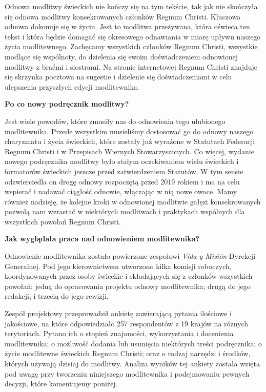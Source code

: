 ﻿\documentclass[9pt,twoside]{extarticle}
\newcommand{\ltrhdr}[1]{{\par\noindent\bf #1\par}}
\begin{document}
Odnowa modlitwy świeckich nie kończy się na tym tekście, tak jak nie skończyła się odnowa modlitwy konsekrowanych członków Regnum Christi. Kluczowa odnowa dokonuje się w życiu. Jest to modlitwa przeżywana, która oświeca ten tekst i która będzie domagać się okresowego odnawiania w miarę upływu naszego życia modlitewnego. Zachęcamy wszystkich członków Regnum Christi, wszystkie modlące się wspólnoty, do dzielenia się swoim doświadczeniem odnowionej modlitwy z braćmi i siostrami. Na stronie internetowej Regnum Christi znajduje się skrzynka pocztowa na sugestie i dzielenie się doświadczeniami w celu ulepszenia przyszłych edycji modlitewnika.


\ltrhdr{Po co nowy podręcznik modlitwy?}


Jest wiele powodów, które zmusiły nas do odnowienia tego ulubionego modlitewnika. Przede wszystkim musieliśmy dostosować go do odnowy naszego charyzmatu i życia świeckich, które zostały już wyrażone w Statutach Federacji Regnum Christi i w Przepisach Wiernych Stowarzyszonych. Co więcej, wydanie nowego podręcznika modlitwy było stałym oczekiwaniem wielu świeckich i formatorów świeckich jeszcze przed zatwierdzeniem Statutów. W tym sensie odzwierciedla on drogę odnowy rozpoczętą przed 2019 rokiem i ma na celu wspierać i nadawać ciągłość odnowie, włączając w nią nowe owoce. Mamy również nadzieję, że kolejne kroki w odnowionej modlitwie gałęzi konsekrowanych pozwolą nam wzrastać w niektórych modlitwach i praktykach wspólnych dla wszystkich powołań Regnum Christi.


\ltrhdr{Jak wyglądała praca nad odnowieniem modlitewnika?}


Odnowienie modlitewnika zostało powierzone zespołowi {\em Vida y Misión} Dyrekcji Generalnej. Pod jego kierownictwem utworzono kilka komisji roboczych, koordynowanych przez osoby świeckie i składających się z członków wszystkich powołań: jedną do opracowania projektu odnowy modlitewnika; drugą do jego redakcji; i trzecią do jego rewizji.


Zespół projektowy przeprowadził ankietę zawierającą pytania ilościowe i jakościowe, na które odpowiedziało 257 respondentów z 19 krajów na różnych terytoriach. Pytano ich o stopień znajomości, wykorzystania i docenienia modlitewnika; o możliwość dodania lub usunięcia niektórych treści podręcznika; o życie modlitewne świeckich Regnum Christi; oraz o rodzaj narzędzi i środków, których używają dzisiaj do modlitwy. Analiza wyników tej ankiety została wzięta pod uwagę przy tworzeniu niniejszego modlitewnika i podejmowaniu pewnych decyzji, które komentujemy poniżej.
\end{document}

